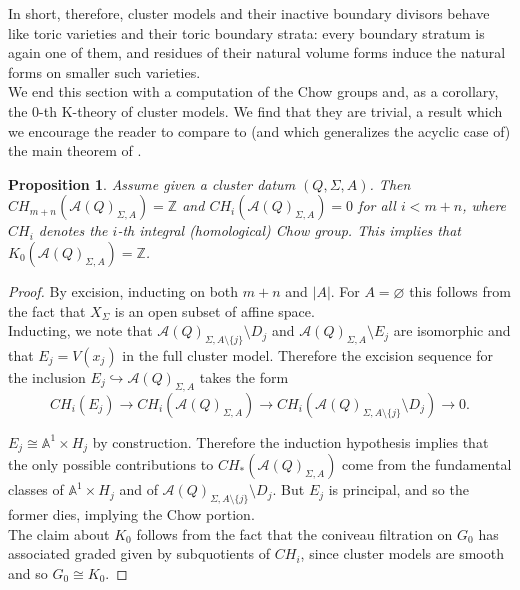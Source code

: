 \documentclass[11pt]{amsart}
\newtheorem{prop}[thm]{Proposition}
\theoremstyle{definition}
\theoremstyle{remark}
\renewcommand{\emptyset}{\varnothing}
\numberwithin{equation}{section}
\begin{document}
In short, therefore, cluster models and their inactive boundary divisors behave like toric varieties and their toric boundary strata: every boundary stratum is again one of them, and residues of their natural volume forms induce the natural forms on smaller such varieties.\\

We end this section with a computation of the Chow groups and, as a corollary, the $0$-th K-theory of cluster models. We find that they are trivial, a result which we encourage the reader to compare to (and which generalizes the acyclic case of) the main theorem of \cite{hlavinka2026chow}.

\begin{prop}\label{chow vanishing}
    Assume given a cluster datum $(Q, \Sigma, A)$. Then $CH_{m + n}(\mathcal{A}(Q)_{\Sigma, A}) = \mathbb{Z}$ and $CH_i(\mathcal{A}(Q)_{\Sigma, A}) = 0$ for all $i < m +n$, where $CH_i$ denotes the $i$-th integral (homological) Chow group. This implies that $K_0(\mathcal{A}(Q)_{\Sigma, A}) = 
    \mathbb{Z}$. 
\end{prop}

\begin{proof}
    By excision, inducting on both $m + n$ and $|A|$. For $A = \emptyset$ this follows from the fact that $X_\Sigma$ is an open subset of affine space.\\

    Inducting, we note that $\mathcal{A}(Q)_{\Sigma, A \setminus \{j\}} \setminus D_j$ and $\mathcal{A}(Q)_{\Sigma, A} \setminus E_j$ are isomorphic and that $E_j = V(x_j)$ in the full cluster model. Therefore the excision sequence for the inclusion $E_j \hookrightarrow \mathcal{A}(Q)_{\Sigma, A}$ takes the form $$CH_i(E_j) \rightarrow CH_i(\mathcal{A}(Q)_{\Sigma, A}) \rightarrow CH_i(\mathcal{A}(Q)_{\Sigma, A \setminus \{j\}} \setminus D_j) \rightarrow 0.$$

    $E_j \cong \mathbb{A}^1 \times H_j$ by construction. Therefore the induction hypothesis implies that the only possible contributions to $CH_*(\mathcal{A}(Q)_{\Sigma, A})$ come from the fundamental classes of $\mathbb{A}^1 \times H_j$ and of $\mathcal{A}(Q)_{\Sigma, A \setminus \{j\}} \setminus D_j$. But $E_j$ is principal, and so the former dies, implying the Chow portion.\\

    The claim about $K_0$ follows from the fact that the coniveau filtration on $G_0$ has associated graded given by subquotients of $CH_i$, since cluster models are smooth and so $G_0 \cong K_0$.
\end{proof}
\end{document}
